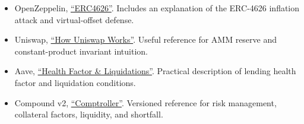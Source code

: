 \begin{itemize}
  Standardized vault share/accounting interface and rounding
  requirements.
\item
  OpenZeppelin,
  \href{https://docs.openzeppelin.com/contracts/5.x/erc4626}{``ERC4626''}.
  Includes an explanation of the ERC-4626 inflation attack and
  virtual-offset defense.
\item
  Uniswap,
  \href{https://developers.uniswap.org/docs/get-started/concepts/how-uniswap-works}{``How
  Uniswap Works''}. Useful reference for AMM reserve and
  constant-product invariant intuition.
\item
  Aave, \href{https://aave.com/help/borrowing/liquidations}{``Health
  Factor \& Liquidations''}. Practical description of lending health
  factor and liquidation conditions.
\item
  Compound v2,
  \href{https://docs.compound.finance/v2/comptroller/}{``Comptroller''}.
  Versioned reference for risk management, collateral factors,
  liquidity, and shortfall.
\end{itemize}
